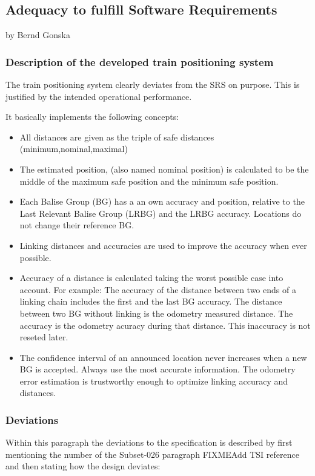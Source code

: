 \subsection{Adequacy to fulfill Software Requirements}
by Bernd Gonska

\subsubsection{Description of the developed train positioning system}
The train positioning system clearly deviates from the SRS on purpose. This is justified by the intended operational performance.

It basically implements the following concepts:
\begin{itemize}
\item All distances are given as the triple of safe distances (minimum,nominal,maximal)

\item The estimated position, (also named nominal position) is calculated to be the middle of the maximum safe position and the minimum safe position.

\item Each Balise Group (BG) has a an own accuracy and position, relative to the Last Relevant Balise Group (LRBG) and the LRBG accuracy. Locations do not change their reference BG.
  
\item Linking distances and accuracies are used to improve the accuracy when ever possible.

\item Accuracy of a distance is calculated taking the worst possible case into account. For example: The accuracy of the distance between two ends of a linking chain includes the first and the last BG accuracy. The distance between two BG without linking is the odometry measured distance. The accuracy is the odometry acuracy during that distance. This inaccuracy is not reseted later.

\item The confidence interval of an announced location never increases when a new BG is accepted. Always use the most accurate information. The odometry error estimation is trustworthy enough to optimize linking accuracy and distances.
\end{itemize}

\subsubsection{Deviations}
Within this paragraph the deviations to the specification is described by first mentioning the number of the Subset-026 paragraph FIXME{Add TSI reference} and then stating how the design deviates:

